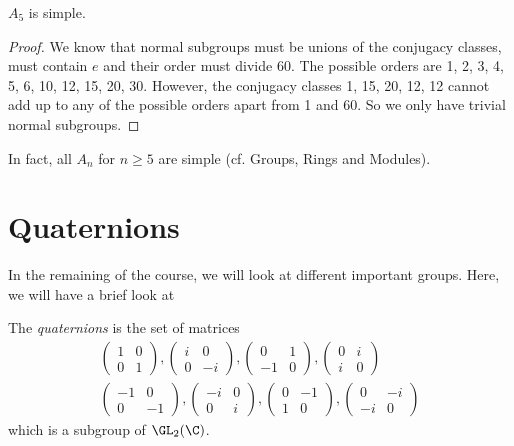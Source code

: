 \documentclass[a4paper]{article}
\begin{document}
\begin{thm}
  $A_5$ is simple.
\end{thm}

\begin{proof}
  We know that normal subgroups must be unions of the conjugacy classes, must contain $e$ and their order must divide 60. The possible orders are 1, 2, 3, 4, 5, 6, 10, 12, 15, 20, 30. However, the conjugacy classes 1, 15, 20, 12, 12 cannot add up to any of the possible orders apart from 1 and 60. So we only have trivial normal subgroups.
\end{proof}
In fact, all $A_n$ for $n\geq 5$ are simple (cf. Groups, Rings and Modules).

\section{Quaternions}
In the remaining of the course, we will look at different important groups. Here, we will have a brief look at
\begin{defi}[Quaternions]
  The \emph{quaternions} is the set of matrices
  \begin{gather*}
    \begin{pmatrix}
      1&0\\0&1
    \end{pmatrix},
    \begin{pmatrix}
      i & 0\\0&-i
    \end{pmatrix},
    \begin{pmatrix}
      0&1\\-1&0
    \end{pmatrix},
    \begin{pmatrix}
      0&i\\i&0
    \end{pmatrix}
    \\
    \begin{pmatrix}
      -1&0\\0&-1
    \end{pmatrix},
    \begin{pmatrix}
      -i & 0\\0&i
    \end{pmatrix},
    \begin{pmatrix}
      0&-1\\1&0
    \end{pmatrix},
    \begin{pmatrix}
      0&-i\\-i&0
    \end{pmatrix}
  \end{gather*}
  which is a subgroup of $\GL_2(\C)$.
\end{defi}
\end{document}
